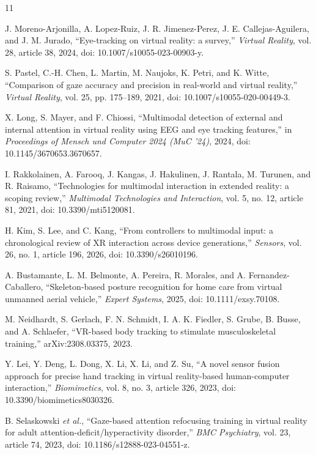 \documentclass[conference]{IEEEtran}
\begin{document}
\begin{thebibliography}{11}

J. Moreno-Arjonilla, A. Lopez-Ruiz, J. R. Jimenez-Perez, J. E. Callejas-Aguilera, and J. M. Jurado, ``Eye-tracking on virtual reality: a survey,'' \emph{Virtual Reality}, vol. 28, article 38, 2024, doi: 10.1007/s10055-023-00903-y.

S. Pastel, C.-H. Chen, L. Martin, M. Naujoks, K. Petri, and K. Witte, ``Comparison of gaze accuracy and precision in real-world and virtual reality,'' \emph{Virtual Reality}, vol. 25, pp. 175--189, 2021, doi: 10.1007/s10055-020-00449-3.

X. Long, S. Mayer, and F. Chiossi, ``Multimodal detection of external and internal attention in virtual reality using EEG and eye tracking features,'' in \emph{Proceedings of Mensch und Computer 2024 (MuC '24)}, 2024, doi: 10.1145/3670653.3670657.

I. Rakkolainen, A. Farooq, J. Kangas, J. Hakulinen, J. Rantala, M. Turunen, and R. Raisamo, ``Technologies for multimodal interaction in extended reality: a scoping review,'' \emph{Multimodal Technologies and Interaction}, vol. 5, no. 12, article 81, 2021, doi: 10.3390/mti5120081.

H. Kim, S. Lee, and C. Kang, ``From controllers to multimodal input: a chronological review of XR interaction across device generations,'' \emph{Sensors}, vol. 26, no. 1, article 196, 2026, doi: 10.3390/s26010196.

A. Bustamante, L. M. Belmonte, A. Pereira, R. Morales, and A. Fernandez-Caballero, ``Skeleton-based posture recognition for home care from virtual unmanned aerial vehicle,'' \emph{Expert Systems}, 2025, doi: 10.1111/exsy.70108.

M. Neidhardt, S. Gerlach, F. N. Schmidt, I. A. K. Fiedler, S. Grube, B. Busse, and A. Schlaefer, ``VR-based body tracking to stimulate musculoskeletal training,'' arXiv:2308.03375, 2023.

Y. Lei, Y. Deng, L. Dong, X. Li, X. Li, and Z. Su, ``A novel sensor fusion approach for precise hand tracking in virtual reality-based human-computer interaction,'' \emph{Biomimetics}, vol. 8, no. 3, article 326, 2023, doi: 10.3390/biomimetics8030326.

B. Selaskowski \emph{et al.}, ``Gaze-based attention refocusing training in virtual reality for adult attention-deficit/hyperactivity disorder,'' \emph{BMC Psychiatry}, vol. 23, article 74, 2023, doi: 10.1186/s12888-023-04551-z.


\end{thebibliography}
\end{document}
